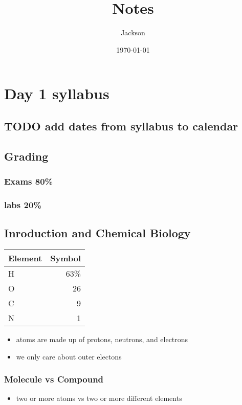 \documentclass[11pt]{article}
\author{Jackson}
\date{\today}
\title{Notes}
\begin{document}
\maketitle
\tableofcontents


\section{Day 1 syllabus}
\label{sec:org80f12fa}
\subsection{{\bfseries\sffamily TODO} add dates from syllabus to calendar}
\label{sec:orga57d153}
\subsection{Grading}
\label{sec:org7fe52fa}
\subsubsection{Exams 80\%}
\label{sec:org06f6e90}
\subsubsection{labs 20\%}
\label{sec:org1c875d7}
\subsection{Inroduction and Chemical Biology}
\label{sec:org01621e2}
\begin{center}
\begin{tabular}{lr}
Element & Symbol\\
\hline
H & 63\%\\
O & 26\\
C & 9\\
N & 1\\
\end{tabular}
\end{center}
\begin{itemize}
\item atoms are made up of protons, neutrons, and electrons
\item we only care about outer electons
\end{itemize}
\subsubsection{Molecule vs Compound}
\label{sec:orgeb0e862}
\begin{itemize}
\item two or more atoms vs two or more different elements
\end{itemize}
\end{document}
